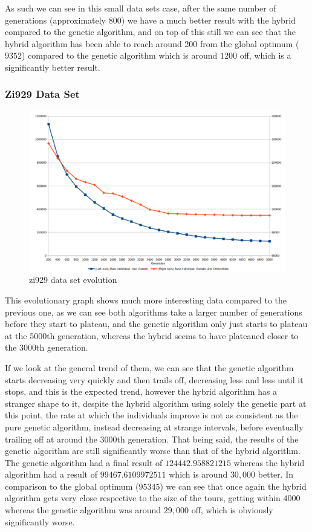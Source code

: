 \documentclass[11pt,a4paper,titlepage]{article}
\begin{document}
As such we can see in this small data sets case, after the same number of generations (approximately 800) we have a much better result with the hybrid compared to the genetic algorithm, and on top of this still we can see that the hybrid algorithm has been able to reach around 200 from the global optimum ($9352$) compared to the genetic algorithm which is around $1200$ off, which is a significantly better result.

\subsubsection{Zi929 Data Set}

\begin{figure}[ht]
	\includegraphics[width=\textwidth]{zi929Evolution}
	\centering
	\caption{zi929 data set evolution}
\end{figure}

This evolutionary graph shows much more interesting data compared to the previous one, as we can see  both algorithms take a larger number of generations before they start to plateau, and the genetic algorithm only just starts to plateau at the 5000th generation, whereas the hybrid seems to have plateaued closer to the 3000th generation.

If we look at the general trend of them, we can see that the genetic algorithm starts decreasing very quickly and then trails off, decreasing less and less until it stops, and this is the expected trend, however the hybrid algorithm has a stranger shape to it, despite the hybrid algorithm using solely the genetic part at this point, the rate at which the individuals improve is not as consistent as the pure genetic algorithm, instead decreasing at strange intervals, before eventually trailing off at around the 3000th generation. That being said, the results of the genetic algorithm are still significantly worse than that of the hybrid algorithm. The genetic algorithm had a final result of $124442.958821215$ whereas the hybrid algorithm had a result of $99467.6109972511$  which is around $30,000$ better. In comparison to the global optimum ($95345$) we can see that once again the hybrid algorithm gets very close respective to the size of the tours, getting within $4000$ whereas the genetic algorithm was around $29,000$ off, which is obviously significantly worse.
\end{document}
